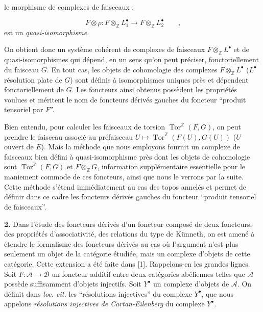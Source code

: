 le morphisme de complexes de faisceaux :

\[
F\otimes\rho:
F\otimes_{\mathbb Z}L_1^{\bullet}
\longrightarrow
F\otimes_{\mathbb Z}L_2^{\bullet}
\qquad\text{,}
\]
est un \emph{quasi-isomorphisme}.

On obtient donc un système cohérent de complexes de faisceaux
$F\otimes_{\mathbb Z}L^{\bullet}$ et de quasi-isomorphismes qui dépend, en un
sens qu'on peut préciser, fonctoriellement du faisceau $G$. En tout cas, les
objets de cohomologie des complexes $F\otimes_{\mathbb Z}L^{\bullet}$
($L^{\bullet}$ résolution plate de $G$) sont définis à isomorphismes uniques
près et dépendent fonctoriellement de $G$. Les foncteurs ainsi obtenus
possèdent les propriétés voulues et méritent le nom de foncteurs dérivés
gauches du foncteur ``produit tensoriel par $F$''.

Bien entendu, pour calculer les faisceaux de torsion
$\operatorname{Tor}^{\mathbb Z}(F,G)$, on peut prendre le faisceau associé au
préfaisceau
$U\longmapsto\operatorname{Tor}^{\mathbb Z}(F(U),G(U))$ ($U$ ouvert de $E$).
Mais la méthode que nous employons fournit un complexe de faisceaux bien défini
à quasi-isomorphisme près dont les objets de cohomologie sont
$\operatorname{Tor}^{\mathbb Z}(F,G)$ et $F\otimes_{\mathbb Z}G$, information
supplémentaire essentielle pour le maniement commode de ces foncteurs, ainsi
que nous le verrons par la suite. Cette méthode s'étend immédiatement au cas
des topos annelés et permet de définir dans ce cadre les foncteurs dérivés
gauches du foncteur ``produit tensoriel de faisceaux''.

\noindent\textbf{2.}\quad
Dans l'étude des foncteurs dérivés d'un foncteur composé de deux foncteurs, des
propriétés d'associativité, des relations du type de Künneth, on est amené à
étendre le formalisme des foncteurs dérivés au cas où l'argument n'est plus
seulement un objet de la catégorie étudiée, mais un complexe d'objets de cette
catégorie. Cette extension a été faite dans [1]. Rappelons-en les grandes
lignes. Soit $F:\mathcal A\to\mathcal B$ un foncteur additif entre deux
catégories abéliennes telles que $\mathcal A$ possède suffisamment d'objets
injectifs. Soit $Y^{\bullet}$ un complexe d'objets de $\mathcal A$. On définit
dans \emph{loc. cit.} les ``résolutions injectives'' du complexe $Y^{\bullet}$,
que nous appelons \emph{résolutions injectives de Cartan-Eilenberg} du complexe
$Y^{\bullet}$.

